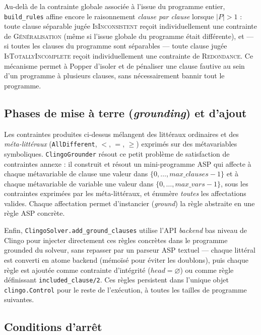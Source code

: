Au-delà de la contrainte globale associée à l'issue du programme entier,
\texttt{build\_rules} affine encore le raisonnement \emph{clause par
clause} lorsque $|P| > 1$ : toute clause séparable jugée
\textsc{IsInconsistent} reçoit individuellement une contrainte de
\textsc{Généralisation} (même si l'issue globale du programme était
différente), et --- si toutes les clauses du programme sont séparables
--- toute clause jugée \textsc{IsTotallyIncomplete} reçoit
individuellement une contrainte de \textsc{Redondance}. Ce mécanisme
permet à Popper d'isoler et de pénaliser une clause fautive au sein d'un
programme à plusieurs clauses, sans nécessairement bannir tout le
programme.

\subsection{Phases de mise à terre (\emph{grounding}) et d'ajout}
\label{sec:popper-ground-add}

Les contraintes produites ci-dessus mélangent des littéraux ordinaires
et des \emph{méta-littéraux} (\texttt{AllDifferent}, $<$, $=$, $\ge$)
exprimés sur des métavariables symboliques. \texttt{ClingoGrounder}
résout ce petit problème de satisfaction de contraintes annexe : il
construit et résout un mini-programme ASP qui affecte à chaque
métavariable de clause une valeur dans $\{0,\dots,\mathit{max\_clauses}-1\}$
et à chaque métavariable de variable une valeur dans
$\{0,\dots,\mathit{max\_vars}-1\}$, sous les contraintes exprimées par
les méta-littéraux, et énumère \emph{toutes} les affectations valides.
Chaque affectation permet d'instancier (\emph{ground}) la règle
abstraite en une règle ASP concrète.

Enfin, \texttt{ClingoSolver.add\_ground\_clauses} utilise l'API
\emph{backend} bas niveau de Clingo pour injecter directement ces
règles concrètes dans le programme grounded du solveur, sans repasser
par un parseur ASP textuel --- chaque littéral est converti en atome
backend (mémoïsé pour éviter les doublons), puis chaque règle est
ajoutée comme contrainte d'intégrité ($\mathit{head} = \varnothing$) ou
comme règle définissant \texttt{included\_clause/2}. Ces règles
persistent dans l'unique objet \texttt{clingo.Control} pour le reste de
l'exécution, à toutes les tailles de programme suivantes.

\subsection{Conditions d'arrêt}
\label{sec:popper-stop}

